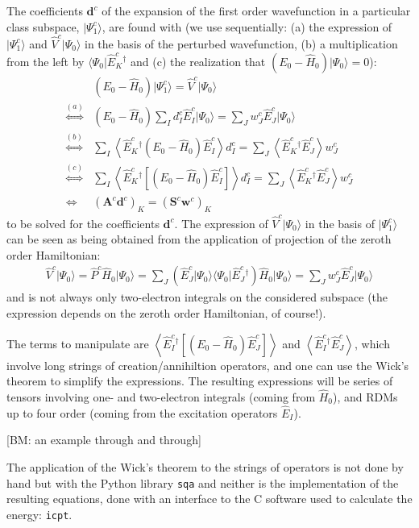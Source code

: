 \documentclass{article}
\newcommand  \todo[1]      {{\color{blue}[BM: #1]}}
\newcommand  \equ[2]       {\begin{align}#2\label{#1}\end{align}}
\renewcommand\b[1]         {\mathbf{#1}}
\newcommand  \var[1]       {\texttt{#1}}
\newcommand  \bra[1]       {\langle #1 \vert}
\newcommand  \ket[1]       {\vert #1  \rangle}
\newcommand  \Expect[1]    {\left\langle  #1 \right\rangle}
\begin{document}
The coefficients $\b{d}^c$ of the expansion of the first order wavefunction in a particular class subspace,
$\ket{\Psi^c_1}$, are found with
(we use sequentially:
(a) the expression of $\ket{\Psi^c_1}$ and $\hat{V}^c\ket{\Psi_0}$ in the basis of the perturbed wavefunction,
(b) a multiplication from the left by $\bra{\Psi_0}{\hat{E}^c_K }{}^\dagger$
and (c) the realization that $(E_0-\hat{H}_0)\ket{\Psi_0}=0$):
\equ{eq:AdSw}{
 &(E_0-\hat{H}_0)\ket{\Psi^c_1}=\hat{V}^c\ket{\Psi_0}
 \\\overset{(a)}{\iff}&
 (E_0-\hat{H}_0)\sum_I  d^c_I\hat{E}^c_{I }\ket{\Psi_0}=\sum_J  w^c_J \hat{E}^c_J \ket{\Psi_0}
 \\\overset{(b)}{\iff}&
 \sum_I  \Expect{\hat{E}^c_K{ }^\dagger(E_0-\hat{H}_0)\hat{E}^c_{I }}d^c_I
=\sum_J  \Expect{ {\hat{E}^c_K }{ }^\dagger\hat{E}^c_J }w^c_J 
 \\\overset{(c)}{\iff}&
 \sum_I \Expect{ {\hat{E}^c_K }{ }^\dagger\left[(E_0-\hat{H}_0)\hat{E}^c_{I }\right]}d^c_I
=\sum_J \Expect{ {\hat{E}^c_K }{ }^\dagger\hat{E}^c_J }w^c_J 
 \\\iff&
 (\b{A}^c\b{d}^c)_K =(\b{S}^c\b{w}^c)_K 
}
to be solved for the coefficients $\b{d}^c$.
The expression of $\hat{V}^c\ket{\Psi_0}$ in the basis of $\ket{\Psi_1^c}$
can be seen as being obtained from the application of projection of the zeroth order Hamiltonian:
\equ{ }{
  \hat{V}^c\ket{\Psi_0}=\hat{P}^c\hat{H}_0\ket{\Psi_0}
  =\sum_J  \left(\hat{E}^c_J  \ket{\Psi_0}\bra{\Psi_0}{\hat{E}^c_J }{ }^\dagger\right)\hat{H}_0\ket{\Psi_0}
  =\sum_J  w^c_J  \hat{E}^c_J \ket{\Psi_0}
}
and is not always only two-electron integrals on the considered subspace
(the expression depends on the zeroth order Hamiltonian, of course!).

The terms to manipulate are $\Expect{\hat{E}_I ^c{ }^\dagger[(E_0-\hat{H}_0)\hat{E}^c_J ]}$ 
and $\Expect{\hat{E}_I ^c{ }^\dagger\hat{E}^c_J }$, 
which involve long strings of creation/annihiltion operators, 
and one can use the Wick's theorem to simplify the expressions. 
The resulting expressions will be series of tensors involving one- and two-electron integrals
(coming from $\hat{H}_0$),
and RDMs up to four order (coming from the excitation operators $\hat{E}_I$).

\todo{an example through and through}

The application of the Wick's theorem to the strings of operators is not done by hand
but with the Python library \var{sqa} and neither is the implementation of the resulting equations,
done with an interface to the C software used to calculate the energy: \var{icpt}.
\end{document}

